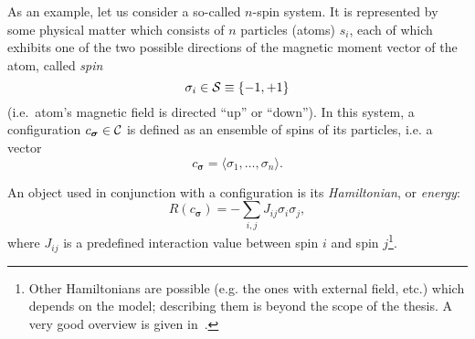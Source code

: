 As an example, let us consider a so-called $n$-spin system. It is represented by
some physical matter which consists of $n$ particles (atoms) $s_i$, each of
which exhibits one of the two possible directions of the magnetic moment vector
of the atom, called \textit{spin}
\begin{equation}
  \sigma_i \in \S \equiv \{-1, +1\}
\end{equation}
(i.e.~atom's magnetic field is directed ``up'' or ``down'').
In this system, a configuration $c_{\boldsymbol\sigma} \in
\C$ is defined as an ensemble of spins of its particles, i.e. a vector
\begin{equation}
  c_{\boldsymbol\sigma} = \langle \sigma_1, \ldots, \sigma_n \rangle. 
\end{equation}
%
%
%

An object used in conjunction with a configuration is its \textit{Hamiltonian},
or \textit{energy}:
\begin{equation}\label{eq:background_deterministic_hamiltonian}
  R(c_{\boldsymbol\sigma}) = -\sum_{i,j} J_{ij} \sigma_i \sigma_j,
\end{equation}
where $J_{ij}$ is a predefined interaction value between spin $i$ and spin
$j$\footnote{Other Hamiltonians are possible (e.g. the ones with external field,
etc.) which depends on the model; describing them is beyond the scope of the
thesis. A very good overview is given in~\citep{bovier2012statistical}.}.

